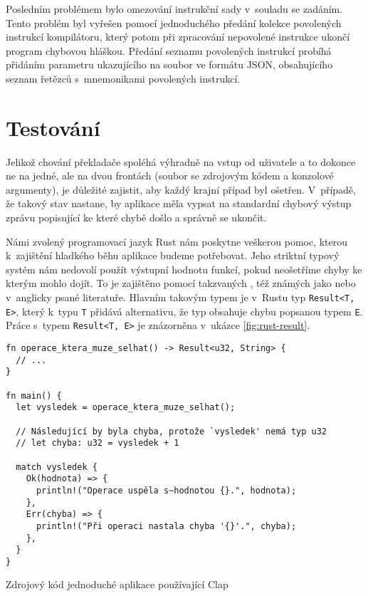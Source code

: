 Posledním problémem bylo omezování instrukční sady v~souladu se zadáním. Tento problém byl vyřešen pomocí jednoduchého předání kolekce povolených instrukcí kompilátoru, který potom při zpracování nepovolené instrukce ukončí program chybovou hláškou. Předání seznamu povolených instrukcí probíhá přidáním parametru ukazujícího na soubor ve formátu JSON, obsahujícího seznam řetězců s~mnemonikami povolených instrukcí.

\section{Testování}
\label{sec:asm-test}

Jelikož chování překladače spoléhá výhradně na vstup od uživatele a to dokonce ne na jedné, ale na dvou frontách (soubor se zdrojovým kódem a konzolové argumenty), je důležité zajistit, aby každý krajní případ byl ošetřen. V~případě, že takový stav nastane, by aplikace měla vypsat na standardní chybový výstup zprávu popisující ke které chybě došlo a správně se ukončit.

Námi zvolený programovací jazyk Rust nám poskytne veškerou pomoc, kterou k~zajištění hladkého běhu aplikace budeme potřebovat. Jeho striktní typový systém nám nedovolí použít výstupní hodnotu funkcí, pokud neošetříme chyby ke kterým mohlo dojít. To je zajištěno pomocí takzvaných , též známých jako  nebo  v~anglicky psané literatuře. Hlavním takovým typem je v~Rustu typ \texttt{Result<T, E>}, který k~typu \texttt{T} přidává alternativu, že typ obsahuje chybu popsanou typem \texttt{E}. Práce s~typem \texttt{Result<T, E>} je znázorněna v~ukázce \ref{fig:rust-result}.

\begin{listing}
\begin{verbatim}
fn operace_ktera_muze_selhat() -> Result<u32, String> {
  // ...
} 

fn main() {
  let vysledek = operace_ktera_muze_selhat();
  
  // Následující by byla chyba, protože `vysledek' nemá typ u32
  // let chyba: u32 = vysledek + 1
  
  match vysledek {
    Ok(hodnota) => {
      println!("Operace uspěla s~hodnotou {}.", hodnota);
    },
    Err(chyba) => {
      println!("Při operaci nastala chyba '{}'.", chyba);
    },
  }
}
\end{verbatim}
\caption{Zdrojový kód jednoduché aplikace používající Clap}
\label{fig:rust-result}
\end{listing}

